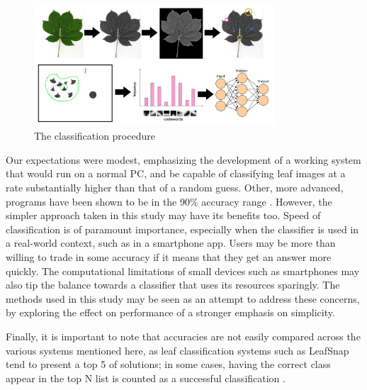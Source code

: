 \begin{figure}[htb]
    \centering
    \includegraphics[width=0.8\textwidth]{flowchart.jpg}
    \caption{The classification procedure}
    \label{fig:overview}
\end{figure}


Our expectations were modest, emphasizing the development of a working system that would run on a normal PC, and be capable of classifying leaf images at a rate substantially higher than that of a random guess. Other, more advanced, programs have been shown to be in the 90\% accuracy range \cite{Wang2011, Kaly2015}.
However, the simpler approach taken in this study may have its benefits too. Speed of classification is of paramount importance, especially when the classifier is used in a real-world context, such as in a smartphone app. Users may be more than willing to trade in some accuracy if it means that they get an answer more quickly. The computational limitations of small devices such as smartphones may also tip the balance towards a classifier that uses its resources sparingly. 
The methods used in this study may be seen as an attempt to address these concerns, by exploring the effect on performance of a stronger emphasis on simplicity.

Finally, it is important to note that accuracies are not easily compared across the various systems mentioned here, as leaf classification systems such as LeafSnap tend to present a top 5 of solutions; in some cases, having the correct class appear in the top N list is counted as a successful classification \cite{Wang2011}.
 	